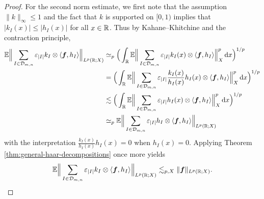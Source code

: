 \begin{proof}
   For the second norm estimate, we first note that the assumption $\|k\|_{\infty} \leq 1$ and the fact that $k$ is supported on $[0,1)$ implies that $|k_{I}(x)| \leq |h_{I}(x)|$ for all $x \in \mathbb{R}$.
   Thus by Kahane--Khitchine and the contraction principle,
   \begin{equation*}
     \begin{aligned}
       \mathbb{E} \Big\| \sum_{I \in \mathcal{D}_{m,n}} \varepsilon_{|I|} k_{I} \otimes \langle \bm{f}, h_{I} \rangle \Big\|_{L^p(\mathbb{R};X)}
       &\simeq_{p} \Big( \int_{\mathbb{R}} \mathbb{E} \Big\| \sum_{I \in \mathcal{D}_{m,n}} \varepsilon_{|I|} k_{I}(x) \otimes \langle \bm{f}, h_{I} \rangle \Big\|_{X}^{p} \, \mathrm{d} x \Big)^{1/p} \\
       &= \Big( \int_{\mathbb{R}} \mathbb{E} \Big\| \sum_{I \in \mathcal{D}_{m,n}} \varepsilon_{|I|} \frac{k_{I}(x)}{h_{I}(x)} h_{I}(x) \otimes \langle \bm{f}, h_{I} \rangle \Big\|_{X}^{p} \, \mathrm{d} x \Big)^{1/p} \\
       &\lesssim \Big( \int_{\mathbb{R}} \mathbb{E} \Big\| \sum_{I \in \mathcal{D}_{m,n}} \varepsilon_{|I|} h_{I}(x) \otimes \langle \bm{f}, h_{I} \rangle \Big\|_{X}^{p} \, \mathrm{d} x \Big)^{1/p} \\
       &\simeq_{p} \mathbb{E} \Big\| \sum_{I \in \mathcal{D}_{m,n}} \varepsilon_{|I|} h_{I} \otimes \langle \bm{f}, h_{I} \rangle \Big\|_{L^p(\mathbb{R};X)}
     \end{aligned}
   \end{equation*}
   with the interpretation $\frac{k_{I}(x)}{h_{I}(x)} h_{I}(x) = 0$ when $h_{I}(x) = 0$.
   Applying Theorem \ref{thm:general-haar-decompositions} once more yields
   \begin{equation*}
     \mathbb{E} \Big\| \sum_{I \in \mathcal{D}_{m,n}} \varepsilon_{|I|} k_{I} \otimes \langle \bm{f}, h_{I} \rangle \Big\|_{L^p(\mathbb{R};X)}
     \lesssim_{p,X} \|\bm{f}\|_{L^p(\mathbb{R};X)}.
   \end{equation*}

 \end{proof}

